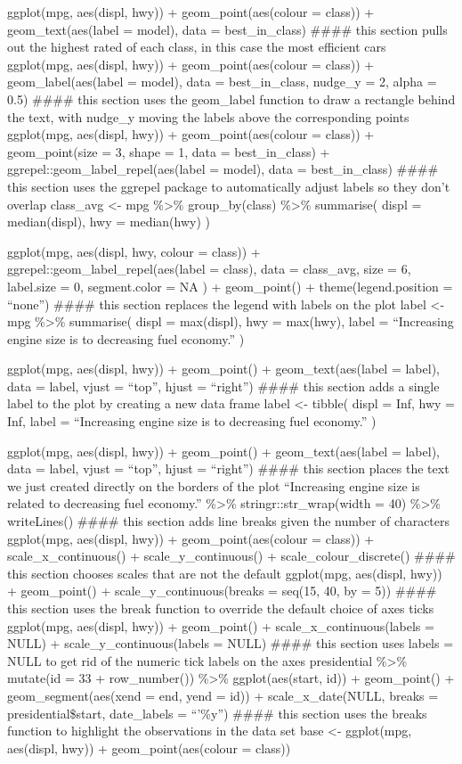 \documentclass[
]{article}
\begin{document}
ggplot(mpg, aes(displ, hwy)) + geom\_point(aes(colour = class)) +
geom\_text(aes(label = model), data = best\_in\_class) \#\#\#\# this
section pulls out the highest rated of each class, in this case the most
efficient cars ggplot(mpg, aes(displ, hwy)) + geom\_point(aes(colour =
class)) + geom\_label(aes(label = model), data = best\_in\_class,
nudge\_y = 2, alpha = 0.5) \#\#\#\# this section uses the geom\_label
function to draw a rectangle behind the text, with nudge\_y moving the
labels above the corresponding points ggplot(mpg, aes(displ, hwy)) +
geom\_point(aes(colour = class)) + geom\_point(size = 3, shape = 1, data
= best\_in\_class) + ggrepel::geom\_label\_repel(aes(label = model),
data = best\_in\_class) \#\#\#\# this section uses the ggrepel package
to automatically adjust labels so they don't overlap class\_avg
\textless- mpg \%\textgreater\% group\_by(class) \%\textgreater\%
summarise( displ = median(displ), hwy = median(hwy) )

ggplot(mpg, aes(displ, hwy, colour = class)) +
ggrepel::geom\_label\_repel(aes(label = class), data = class\_avg, size
= 6, label.size = 0, segment.color = NA ) + geom\_point() +
theme(legend.position = ``none'') \#\#\#\# this section replaces the
legend with labels on the plot label \textless- mpg \%\textgreater\%
summarise( displ = max(displ), hwy = max(hwy), label = ``Increasing
engine size is \nrelated to decreasing fuel economy.'' )

ggplot(mpg, aes(displ, hwy)) + geom\_point() + geom\_text(aes(label =
label), data = label, vjust = ``top'', hjust = ``right'') \#\#\#\# this
section adds a single label to the plot by creating a new data frame
label \textless- tibble( displ = Inf, hwy = Inf, label = ``Increasing
engine size is \nrelated to decreasing fuel economy.'' )

ggplot(mpg, aes(displ, hwy)) + geom\_point() + geom\_text(aes(label =
label), data = label, vjust = ``top'', hjust = ``right'') \#\#\#\# this
section places the text we just created directly on the borders of the
plot ``Increasing engine size is related to decreasing fuel economy.''
\%\textgreater\% stringr::str\_wrap(width = 40) \%\textgreater\%
writeLines() \#\#\#\# this section adds line breaks given the number of
characters ggplot(mpg, aes(displ, hwy)) + geom\_point(aes(colour =
class)) + scale\_x\_continuous() + scale\_y\_continuous() +
scale\_colour\_discrete() \#\#\#\# this section chooses scales that are
not the default ggplot(mpg, aes(displ, hwy)) + geom\_point() +
scale\_y\_continuous(breaks = seq(15, 40, by = 5)) \#\#\#\# this section
uses the break function to override the default choice of axes ticks
ggplot(mpg, aes(displ, hwy)) + geom\_point() +
scale\_x\_continuous(labels = NULL) + scale\_y\_continuous(labels =
NULL) \#\#\#\# this section uses labels = NULL to get rid of the numeric
tick labels on the axes presidential \%\textgreater\% mutate(id = 33 +
row\_number()) \%\textgreater\% ggplot(aes(start, id)) + geom\_point() +
geom\_segment(aes(xend = end, yend = id)) + scale\_x\_date(NULL, breaks
= presidential\$start, date\_labels = ``'\%y'') \#\#\#\# this section
uses the breaks function to highlight the observations in the data set
base \textless- ggplot(mpg, aes(displ, hwy)) + geom\_point(aes(colour =
class))
\end{document}
